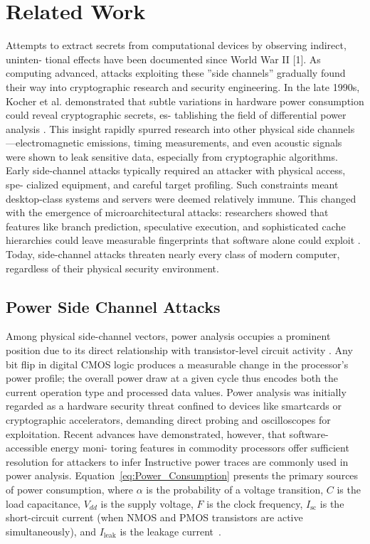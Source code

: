 \section{Related Work}
Attempts to extract secrets from computational devices by observing indirect, uninten-
tional effects have been documented since World War II [1]. As computing advanced,
attacks exploiting these ”side channels” gradually found their way into cryptographic
research and security engineering. In the late 1990s, Kocher et al. demonstrated that
subtle variations in hardware power consumption could reveal cryptographic secrets, es-
tablishing the field of differential power analysis \cite{10.1007/3-540-48405-1_2}. This insight rapidly spurred research
into other physical side channels—electromagnetic emissions, timing measurements, and
even acoustic signals were shown to leak sensitive data, especially from cryptographic
algorithms.
Early side-channel attacks typically required an attacker with physical access, spe-
cialized equipment, and careful target profiling. Such constraints meant desktop-class
systems and servers were deemed relatively immune. This changed with the emergence
of microarchitectural attacks: researchers showed that features like branch prediction, speculative execution, and sophisticated cache hierarchies could leave measurable fingerprints that software alone could exploit \cite{8835233}\cite{3b07f496768442f48538a30b9f302940}. Today, side-channel attacks threaten nearly every class of modern computer, regardless of their physical security environment. 
\subsection{Power Side Channel Attacks}
Among physical side-channel vectors, power analysis occupies a prominent position due
to its direct relationship with transistor-level circuit activity . Any bit flip in digital
CMOS logic produces a measurable change in the processor’s power profile; the overall
power draw at a given cycle thus encodes both the current operation type and processed
data values. Power analysis was initially regarded as a hardware security threat confined to devices like smartcards or cryptographic accelerators, demanding direct probing and oscilloscopes for exploitation.
Recent advances have demonstrated, however, that software-accessible energy moni-
toring features in commodity processors offer sufficient resolution for attackers to infer
Instructive power traces are commonly used in power analysis. Equation~\ref{eq:Power_Consumption} presents the primary sources of power consumption, where $\alpha$ is the probability of a voltage transition, $C$ is the load capacitance, $V_{dd}$ is the supply voltage, $F$ is the clock frequency, $I_{\text{sc}}$ is the short-circuit current (when NMOS and PMOS transistors are active simultaneously), and $I_{\text{leak}}$ is the leakage current~\cite{371964}.



